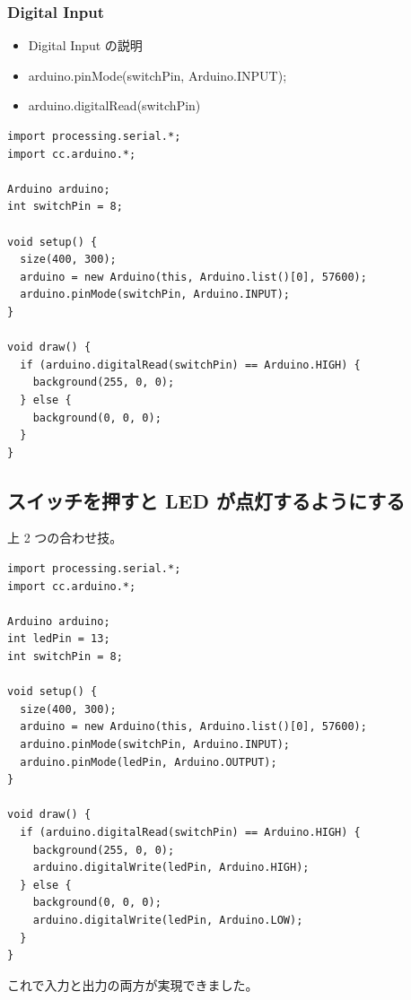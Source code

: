\documentclass[11pt,a4paper]{jarticle}
\begin{document}
\subsubsection*{Digital Input}
\begin{itemize}
 \item Digital Input の説明
 \item arduino.pinMode(switchPin, Arduino.INPUT);  
 \item arduino.digitalRead(switchPin)
\end{itemize}

\begin{lstlisting}
import processing.serial.*;
import cc.arduino.*;

Arduino arduino;
int switchPin = 8;
 
void setup() {
  size(400, 300);
  arduino = new Arduino(this, Arduino.list()[0], 57600);
  arduino.pinMode(switchPin, Arduino.INPUT);  
}
 
void draw() {
  if (arduino.digitalRead(switchPin) == Arduino.HIGH) {
    background(255, 0, 0);
  } else {
    background(0, 0, 0);
  }
}
\end{lstlisting}



\subsection*{スイッチを押すと LED が点灯するようにする}
上 2 つの合わせ技。

\begin{lstlisting}
import processing.serial.*;
import cc.arduino.*;

Arduino arduino;
int ledPin = 13;
int switchPin = 8;
 
void setup() {
  size(400, 300);
  arduino = new Arduino(this, Arduino.list()[0], 57600);
  arduino.pinMode(switchPin, Arduino.INPUT);
  arduino.pinMode(ledPin, Arduino.OUTPUT);
}
 
void draw() {
  if (arduino.digitalRead(switchPin) == Arduino.HIGH) {
    background(255, 0, 0);
    arduino.digitalWrite(ledPin, Arduino.HIGH);
  } else {
    background(0, 0, 0);
    arduino.digitalWrite(ledPin, Arduino.LOW);
  }
}
\end{lstlisting}

これで入力と出力の両方が実現できました。
\end{document}
